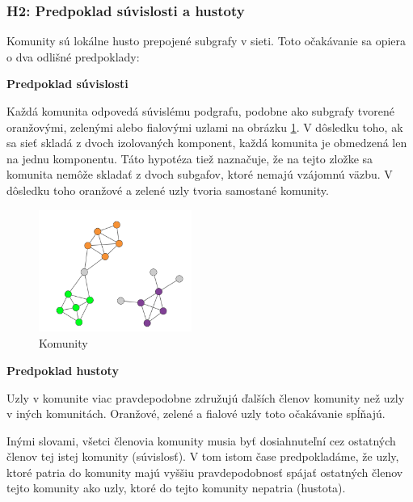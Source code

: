 \documentclass[slovak,master,public,dept460,male,cpdeclaration,oneside]{diploma}
\begin{document}
\subsubsection{H2: Predpoklad súvislosti a hustoty}
Komunity sú lokálne husto prepojené subgrafy v sieti. Toto očakávanie sa opiera o dva odlišné predpoklady:
\begin{description}
\item \textbf{Predpoklad súvislosti}


Každá komunita odpovedá súvislému podgrafu, podobne ako subgrafy tvorené oranžovými, zelenými alebo fialovými uzlami na obrázku \ref{komunity}. V dôsledku toho, ak sa sieť skladá z dvoch izolovaných komponent, každá komunita je obmedzená len na jednu komponentu. Táto hypotéza tiež naznačuje, že na tejto zložke sa komunita nemôže skladať z dvoch subgafov, ktoré nemajú vzájomnú väzbu. V dôsledku toho oranžové a zelené uzly tvoria samostané komunity. \cite{barabasi2016network}


\begin{figure}[H]
\centering
\includegraphics[width=5cm,height=4cm]{figures/komm}
\caption{Komunity}
\label{komunity}
\end{figure}

\item \textbf{Predpoklad hustoty}


Uzly v komunite viac pravdepodobne združujú ďalších členov komunity než uzly v iných komunitách. Oranžové, zelené a fialové uzly toto očakávanie spĺňajú. \cite{barabasi2016network}

\end{description}

Inými slovami, všetci členovia komunity musia byť dosiahnuteľní cez ostatných členov tej istej komunity (súvislosť). V tom istom čase predpokladáme, že uzly, ktoré patria do komunity majú vyššiu pravdepodobnosť spájať ostatných členov tejto komunity ako uzly, ktoré do tejto komunity nepatria (hustota). \cite{barabasi2016network}
\end{document}

